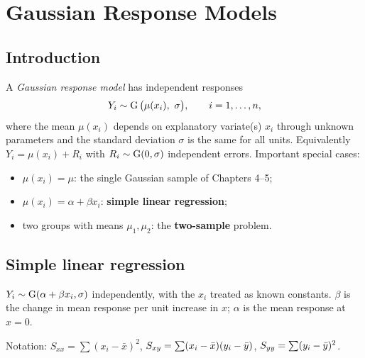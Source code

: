 \chapter{Gaussian Response Models}

\section{Introduction}

A \emph{Gaussian response model} has independent responses
\[
Y_i\sim\operatorname{G}\big(\mu(x_i),\ \sigma\big),\qquad i=1,\dots,n,
\]
where the mean $\mu(x_i)$ depends on explanatory variate(s) $x_i$ through unknown
parameters and the standard deviation $\sigma$ is the same for all units. Equivalently
$Y_i = \mu(x_i) + R_i$ with $R_i\sim\operatorname{G}(0,\sigma)$ independent errors. Important
special cases:
\begin{itemize}
  \item $\mu(x_i) = \mu$: the single Gaussian sample of Chapters 4--5;
  \item $\mu(x_i) = \alpha+\beta x_i$: \textbf{simple linear regression};
  \item two groups with means $\mu_1,\mu_2$: the \textbf{two-sample} problem.
\end{itemize}

\section{Simple linear regression}

\begin{definition}[Model]
$Y_i\sim\operatorname{G}(\alpha+\beta x_i,\sigma)$ independently, with the $x_i$ treated as known
constants. $\beta$ is the change in mean response per unit increase in $x$; $\alpha$ is
the mean response at $x=0$.
\end{definition}

Notation: $S_{xx} = \sum(x_i-\bar x)^2$, $S_{xy} = \sum(x_i-\bar x)(y_i-\bar{y})$,
$S_{yy} = \sum(y_i-\bar{y})^2$.

